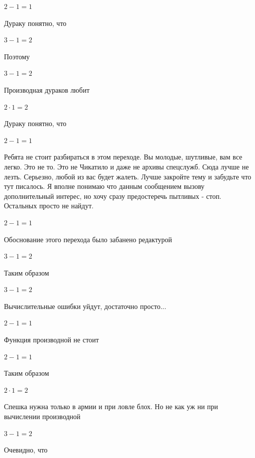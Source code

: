 \documentclass[12pt,a4paper,fleqn]{article}
\begin{document}
\begin{center}$2-1 = 1$\end{center}
Дураку понятно, что

\begin{center}$3-1 = 2$\end{center}
Поэтому

\begin{center}$3-1 = 2$\end{center}
Производная дураков любит\cite{link2}

\begin{center}$2 \cdot 1 = 2$\end{center}
Дураку понятно, что

\begin{center}$2-1 = 1$\end{center}
Ребята не стоит разбираться в этом переходе. Вы молодые, шутливые, вам все легко. Это не то. Это не Чикатило и даже не архивы спецслужб. Сюда лучше не лезть. Серьезно, любой из вас будет жалеть. Лучше закройте тему и забудьте что тут писалось. Я вполне понимаю что данным сообщением вызову дополнительный интерес, но хочу сразу предостеречь пытливых - стоп. Остальных просто не найдут.

\begin{center}$2-1 = 1$\end{center}
Обоснование этого перехода было забанено редактурой

\begin{center}$3-1 = 2$\end{center}
Таким образом

\begin{center}$3-1 = 2$\end{center}
Вычислительные ошибки уйдут, достаточно просто...

\begin{center}$2-1 = 1$\end{center}
Функция производной не стоит\cite{link2}

\begin{center}$2-1 = 1$\end{center}
Таким образом

\begin{center}$2 \cdot 1 = 2$\end{center}
Спешка нужна только в армии и при ловле блох. Но не как уж ни при вычислении производной\cite{link2}

\begin{center}$3-1 = 2$\end{center}
Очевидно, что
\end{document}
